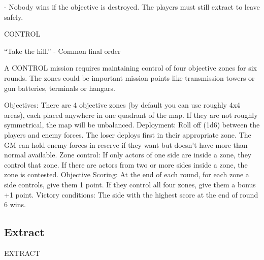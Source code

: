                                                                                                                       


          - Nobody wins if the objective is destroyed. The players must still extract to leave safely.  

CONTROL  

         “Take the hill.”  
                      -    Common final order  

A CONTROL mission requires maintaining control of four objective zones for six rounds. The  
zones could be important mission points like transmission towers or gun batteries, terminals or  
hangars.  

Objectives: There are 4 objective zones (by default you can use roughly 4x4 areas), each placed  
anywhere in one quadrant of the map. If they are not roughly symmetrical, the map will be  
unbalanced.  
Deployment: Roll off (1d6) between the players and enemy forces. The loser deploys first in their  
appropriate zone. The GM can hold enemy forces in reserve if they want but doesn’t have more  
than normal available.  
Zone control: If only actors of one side are inside a zone, they control that zone. If there are  
actors from two or more sides inside a zone, the zone is contested.  
Objective Scoring: At the end of each round, for each zone a side controls, give them 1 point. If  
they control all four zones, give them a bonus +1 point.  
Victory conditions: The side with the highest score at the end of round 6 wins.
 

                                                                                                                  

\subsection{Extract}
   

                                                                     EXTRACT  

